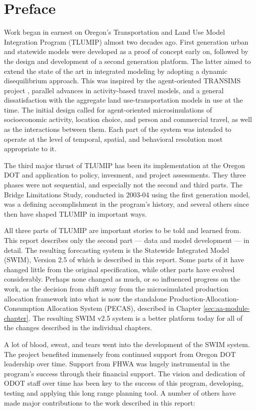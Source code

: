 \chapter*{Preface}
Work began in earnest on Oregon's Transportation and Land Use Model Integration Program (TLUMIP) almost two decades ago. First generation urban and statewide models were developed as a proof of concept early on, followed by the design and development of a second generation platform. The latter aimed to extend the state of the art in integrated modeling by adopting a dynamic disequilibrium approach. This was inspired by the agent-oriented TRANSIMS project \citep{smith95}, parallel advances in activity-based travel models, and a general dissatisfaction with the aggregate land use-transportation models in use at the time. The initial design called for agent-oriented microsimulations of socioeconomic activity, location choice, and person and commercial travel, as well as the interactions between them. Each part of the system was intended to operate at the level of temporal, spatial, and behavioral resolution most appropriate to it.

The third major thrust of TLUMIP has been its implementation at the Oregon DOT and application to policy, invesment, and project assessments. They three phases were not sequential, and especially not the second and third parts. The Bridge Limitations Study, conducted in 2003-04 using the first generation model, was a defining accomplishment in the program's history, and several others since then have shaped TLUMIP in important ways. 

All three parts of TLUMIP are important stories to be told and learned from. This report describes only the second part --- data and model development --- in detail. The resulting forecasting system is the Statewide Integrated Model (SWIM), Version 2.5 of which is described in this report. Some parts of it have changed little from the original specification, while other parts have evolved considerably. Perhaps none changed as much, or so influenced progress on the work, as the decision from shift away from the microsimulated production allocation framework into what is now the standalone Production-Allocation-Consumption Allocation System (PECAS), described in Chapter \ref{sec:aa-module-chapter}. The resulting SWIM v2.5 system is a better platform today for all of the changes described in the individual chapters.

A lot of blood, sweat, and tears went into the development of the SWIM system. The project benefited immensely from continued support from Oregon DOT leadership over time. Support from FHWA was hugely instrumental in the program's success through their financial support. The vision and dedication of ODOT staff over time has been key to the success of this program, developing, testing and applying this long range planning tool. A number of others have made major contributions to the work described in this report:

